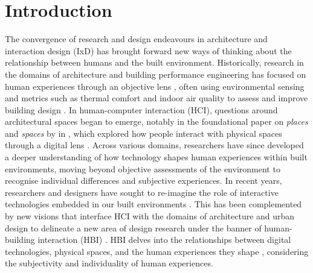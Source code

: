 \section{Introduction}
\label{sec-ch2:introduction}
The convergence of research and design endeavours in architecture and interaction design (IxD) has brought forward new ways of thinking about the relationship between humans and the built environment. Historically, research in the domains of architecture and building performance engineering has focused on human experiences through an objective lens \cite{kirsh2019architects}, often using environmental sensing and metrics such as thermal comfort and indoor air quality to assess and improve building design \cite{chappells2004comfort}.
In human-computer interaction (HCI), questions around architectural spaces began to emerge, notably in the foundational paper on \emph{places} and \emph{spaces} by \citet{harrison1996re} in \citeyear{harrison1996re}, which explored how people interact with physical spaces through a digital lens \cite{harrison1996re}. 
Across various domains, researchers have since developed a deeper understanding of how technology shapes human experiences within built environments, moving beyond objective assessments of the environment to recognise individual differences and subjective experiences. In recent years, researchers and designers have sought to re-imagine the role of interactive technologies embedded in our built environments  \cite{wiberg2020interaction, alavi2018artifacts}. This has been complemented by new visions that interface HCI with the domains of architecture and urban design to delineate a new area of design research under the banner of human-building interaction (HBI) \cite{alavi2019introduction}. HBI delves into the relationships between digital technologies, physical spaces, and the human experiences they shape \cite{alavi2019introduction,becerik2022field}, considering the subjectivity and individuality of human experiences. 

